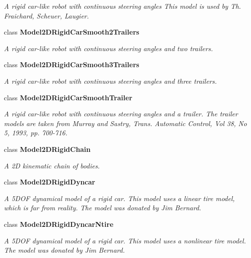 \begin{CompactItemize}
\begin{CompactList}\small\item\em A rigid car-like robot with continuous steering angles This model is used by Th. Fraichard, Scheuer, Laugier.\item\end{CompactList}\item 
class {\bf Model2DRigid\-Car\-Smooth2Trailers}
\begin{CompactList}\small\item\em A rigid car-like robot with continuous steering angles and two trailers.\item\end{CompactList}\item 
class {\bf Model2DRigid\-Car\-Smooth3Trailers}
\begin{CompactList}\small\item\em A rigid car-like robot with continuous steering angles and three trailers.\item\end{CompactList}\item 
class {\bf Model2DRigid\-Car\-Smooth\-Trailer}
\begin{CompactList}\small\item\em A rigid car-like robot with continuous steering angles and a trailer. The trailer models are taken from Murray and Sastry, Trans. Automatic Control, Vol 38, No 5, 1993, pp. 700-716.\item\end{CompactList}\item 
class {\bf Model2DRigid\-Chain}
\begin{CompactList}\small\item\em A 2D kinematic chain of bodies.\item\end{CompactList}\item 
class {\bf Model2DRigid\-Dyncar}
\begin{CompactList}\small\item\em A 5DOF dynamical model of a rigid car. This model uses a linear tire model, which is far from reality. The model was donated by Jim Bernard.\item\end{CompactList}\item 
class {\bf Model2DRigid\-Dyncar\-Ntire}
\begin{CompactList}\small\item\em A 5DOF dynamical model of a rigid car. This model uses a nonlinear tire model. The model was donated by Jim Bernard.\item\end{CompactList}\item 

\end{CompactItemize}
